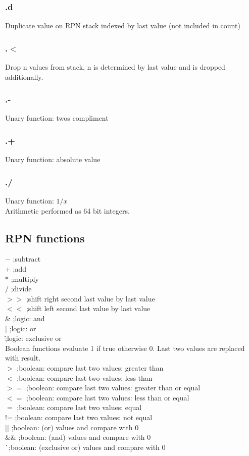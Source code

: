 \documentclass[a4paper,11pt]{article}
\begin{document}
\subsubsection{.d} 
 Duplicate value on RPN stack indexed by last value (not included in count)

\subsubsection{.$<$} 
 Drop n values from stack, n is determined by last value and is dropped additionally.

\subsubsection{.-} 
 Unary function: twos compliment

\subsubsection{.+} 
 Unary function: absolute value

\subsubsection{./} 
 Unary function: $1/x$\\
 Arithmetic performed as 64 bit integers.\\

\subsection{RPN functions}
$-$ ;subtract\\
$+$ ;add\\
$*$ ;multiply\\
$/$ ;divide\\
$>>$ ;shift right second last value by last value\\
$<<$ ;shift left second last value by last value\\
\& ;logic: and\\
$|$ ;logic: or\\
\^  ;logic: exclusive or\\

Boolean functions evaluate 1 if true otherwise 0. Last two values are replaced with result.\\
$>$ ;boolean: compare last two values: greater than\\
$<$ ;boolean: compare last two values: less than\\
$>=$ ;boolean: compare last two values: greater than or equal\\
$<=$ ;boolean: compare last two values: less than or equal\\
$=$ ;boolean: compare last two values: equal\\
!= ;boolean: compare last two values: not equal\\
$||$ ;boolean: (or) values and compare with 0\\
\&\& ;boolean: (and) values and compare with 0\\
^^ ;boolean: (exclusive or) values and compare with 0\\
\end{document}

